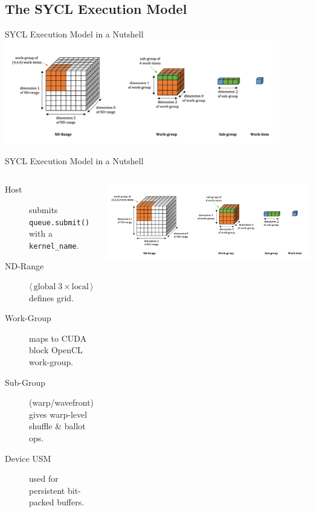 \subsection{The SYCL Execution Model}
\begin{frame}{SYCL Execution Model in a Nutshell}
      \centering
      \includegraphics[width=0.9\textwidth]{2_framework/research_objective_2_sycl_eval/sycl.png}\par %
\end{frame}


\begin{frame}{SYCL Execution Model in a Nutshell}
  \begin{columns}
      \tiny
      \begin{description}
        \item[Host] submits \texttt{queue.submit()} with a \texttt{kernel\_name}.
        \item[ND-Range] $\langle\,\text{global}\;3\!\times\!\text{local}\,\rangle$ defines grid.
        \item[Work-Group] maps to CUDA block \/ OpenCL work-group.
        \item[Sub-Group] (warp/wavefront) gives warp-level shuffle \& ballot ops.
        \item[Device USM] used for persistent bit-packed buffers.
      \end{description}
      \centering
      \includegraphics[width=1\textwidth]{2_framework/research_objective_2_sycl_eval/sycl.png}\par %
  \end{columns}
\end{frame}

